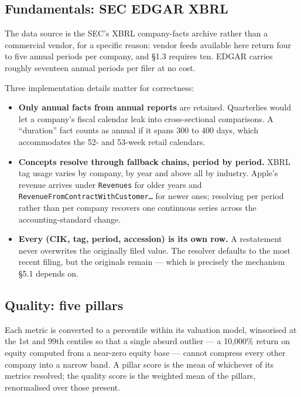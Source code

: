 \documentclass[11pt,a4paper]{article}
\begin{document}
\subsection{Fundamentals: SEC EDGAR XBRL}

The data source is the SEC's XBRL company-facts archive rather than a
commercial vendor, for a specific reason: vendor feeds available here return
four to five annual periods per company, and \S1.3 requires ten. EDGAR carries
roughly seventeen annual periods per filer at no cost.

Three implementation details matter for correctness:

\begin{itemize}[leftmargin=1.4em,itemsep=0.25em]
  \item \textbf{Only annual facts from annual reports} are retained.
  Quarterlies would let a company's fiscal calendar leak into cross-sectional
  comparisons. A ``duration'' fact counts as annual if it spans 300 to 400
  days, which accommodates the 52- and 53-week retail calendars.
  \item \textbf{Concepts resolve through fallback chains, period by period.}
  XBRL tag usage varies by company, by year and above all by industry. Apple's
  revenue arrives under \texttt{Revenues} for older years and
  \texttt{RevenueFromContractWithCustomer\dots} for newer ones; resolving per
  period rather than per company recovers one continuous series across the
  accounting-standard change.
  \item \textbf{Every (CIK, tag, period, accession) is its own row.} A
  restatement never overwrites the originally filed value. The resolver
  defaults to the most recent filing, but the originals remain --- which is
  precisely the mechanism \S5.1 depends on.
\end{itemize}

\subsection{Quality: five pillars}

Each metric is converted to a percentile within its valuation model, winsorised
at the 1st and 99th centiles so that a single absurd outlier --- a 10,000\%
return on equity computed from a near-zero equity base --- cannot compress every
other company into a narrow band. A pillar score is the mean of whichever of
its metrics resolved; the quality score is the weighted mean of the pillars,
renormalised over those present.
\end{document}
